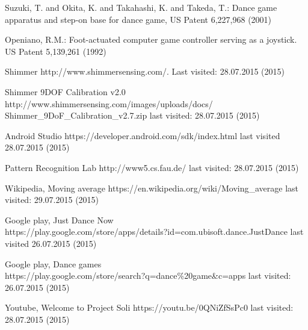 \documentclass[conference]{IEEEtran}
\begin{document}
\begin{thebibliography}{5}

Suzuki, T. and Okita, K. and Takahashi, K. and Takeda, T.: {Dance game apparatus and step-on base for dance game}, US Patent 6,227,968 (2001)

Openiano, R.M.: {Foot-actuated computer game controller serving as a joystick}. US Patent 5,139,261 (1992)

Shimmer {http://www.shimmersensing.com/}. Last visited: 28.07.2015 (2015)

Shimmer 9DOF Calibration v2.0\\{http://www.shimmersensing.com/images/uploads/docs/\\Shimmer\_9DoF\_Calibration\_v2.7.zip} last visited: 28.07.2015 (2015)

Android Studio {https://developer.android.com/sdk/index.html} last visited 28.07.2015 (2015)

Pattern Recognition Lab {http://www5.cs.fau.de/} last visited: 28.07.2015 (2015)

Wikipedia, Moving average {https://en.wikipedia.org/wiki/Moving\_average} last visited: 29.07.2015 (2015)

Google play, Just Dance Now\\{https://play.google.com/store/apps/details?id=com.ubisoft.dance.JustDance} last visited 26.07.2015 (2015)

Google play, Dance games\\{https://play.google.com/store/search?q=dance\%20game\&c=apps} last visited: 26.07.2015 (2015)

Youtube, Welcome to Project Soli {https://youtu.be/0QNiZfSsPc0} last visited: 28.07.2015 (2015)

\end{thebibliography}

\end{document}
